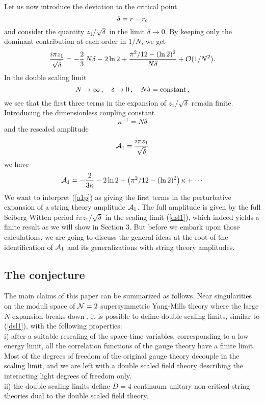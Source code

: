 \documentclass[a4paper,12pt]{article}
\def\rc{r_{\rm c}}\def\gc{g_{\rm c}}
\begin{document}
Let us now introduce the deviation to the critical point
%
\begin{equation}
\label{delta}
\delta = r-\rc
\end{equation}
%
and consider the quantity $z_1/\sqrt{\delta}$ in the limit
$\delta\rightarrow 0$. By keeping only the dominant contribution
at each order in $1/N$, we get
%
\begin{equation}
\label{a1simple}
{i\pi z_1\over\sqrt{\delta}} = -{2\over 3}\, N\delta - 2\ln 2+ 
{\pi^2/12 - (\ln 2)^2\over N\delta} + {\cal O}(1/N^2).
\end{equation}
%
In the double scaling limit
%
\begin{equation}
\label{dsl1}
N\rightarrow\infty\, , \quad \delta\rightarrow 0\, ,\quad
N\delta = {\rm constant}\, ,
\end{equation}
%
we see that the first three terms in the expansion of
$z_1/\sqrt{\delta}$ remain finite.
Introducing the dimensionless coupling constant
%
\begin{equation}
\label{kappadef}
\kappa ^{-1} = N\delta
\end{equation}
%
and the rescaled amplitude
%
\begin{equation}
\label{a1def}
{\cal A}_1 = {i\pi z_1\over\sqrt{\delta}}
\end{equation}
%
we have 
%
\begin{equation}
\label{a1p}
{\cal A}_1 = -{2\over 3\kappa} - 2\ln 2 + 
\left(\pi^2/12 - (\ln 2)^2\right) \kappa + \cdots
\end{equation}
%
We want to interpret (\ref{a1p}) as giving the first terms in the
perturbative expansion of a string theory amplitude ${\cal A}_1$. The
full amplitude is given by the full Seiberg-Witten period $i\pi
z_1/\sqrt{\delta}$ in the scaling limit (\ref{dsl1}), which indeed yields
a finite result as we will show in Section 3. But before we embark upon 
those calculations, we are going to discuss the general ideas 
at the root of the identification of ${\cal A}_1$ and its
generalizations with string theory amplitudes.

%
\subsection{The conjecture}
%

The main claims of this paper can be summarized as follows.
Near singularities on the moduli space of ${\cal
N}=2$ supersymmetric Yang-Mills theory where the large $N$ expansion
breaks down \cite{fer}, it is possible to define double scaling limits,
similar to (\ref{dsl1}), with the following properties:\\
\noindent i) after a suitable rescaling of the space-time variables,
corresponding to a low energy limit, all the
correlation functions of the gauge theory have a finite limit.  
Most of the degrees of freedom of the original gauge 
theory decouple in the
scaling limit, and we are left with a double scaled field theory
describing the interacting light degrees of freedom only.\\
\noindent ii) the double scaling limits define $D=4$ continuum unitary
non-critical string theories dual to the double scaled field theory.
\end{document}
